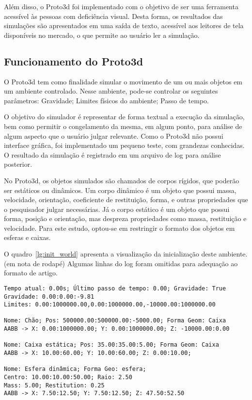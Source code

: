 \documentclass[12pt]{article}
\begin{document}
Além disso, o Proto3d foi implementado com o objetivo de ser uma ferramenta acessível às pessoas com deficiência visual. Desta forma, os resultados das simulações são apresentados em uma saída de texto, acessível aos leitores de tela disponíveis no mercado, o que permite ao usuário ler a simulação.

\subsection {Funcionamento do Proto3d}
O Proto3d tem como finalidade simular o movimento de um ou mais objetos em um ambiente controlado. Nesse ambiente, pode-se controlar os seguintes parâmetros: Gravidade; Limites físicos do ambiente; Passo de tempo.

O objetivo do simulador é representar de forma textual a execução da simulação, bem como permitir o congelamento da mesma, em algum ponto, para análise de algum aspecto que o usuário julgar relevante. Como o Proto3d não possui interface gráfica, foi implementado um pequeno teste, com grandezas conhecidas. O resultado da simulação é registrado em um arquivo de log para análise posterior.

No Proto3d, os objetos simulados são chamados de corpos rígidos, que poderão ser estáticos ou dinâmicos. Um corpo dinâmico é um objeto que possui massa, velocidade, orientação, coeficiente de restituição, forma, e outras propriedades que o pesquisador julgar necessárias. Já o corpo estático é um objeto que possui forma, posição e orientação, mas despreza propriedades como massa, restituição e velocidade. Para este estudo, optou-se em restringir o formato dos objetos em esferas e caixas.

O quadro~\ref{lg:init_world} apresenta a visualização da inicialização deste ambiente. (em nota de rodapé) Algumas linhas do log foram omitidas para adequação ao formato de artigo.

\begin{lstlisting}[frame=single,caption=Inicialização do ambiente\label{lg:init_world}]
Tempo atual: 0.00s; Último passo de tempo: 0.00; Gravidade: True
Gravidade: 0.00:0.00:-9.81
Limites: 0.00:1000000.00,0.00:1000000.00,-10000.00:1000000.00

Nome: Chão; Pos: 500000.00:500000.00:-5000.00; Forma Geom: Caixa
AABB -> X: 0.00:1000000.00; Y: 0.00:1000000.00; Z: -10000.00:0.00 

Nome: Caixa estática; Pos: 35.00:35.00:5.00; Forma Geom: Caixa
AABB -> X: 10.00:60.00; Y: 10.00:60.00; Z: 0.00:10.00; 

Nome: Esfera dinâmica; Forma Geo: esfera; 
Centro: 10.00:10.00:50.00; Raio: 2.50
Mass: 5.00; Restitution: 0.25
AABB -> X: 7.50:12.50; Y: 7.50:12.50; Z: 47.50:52.50
\end{lstlisting}
\end{document}
